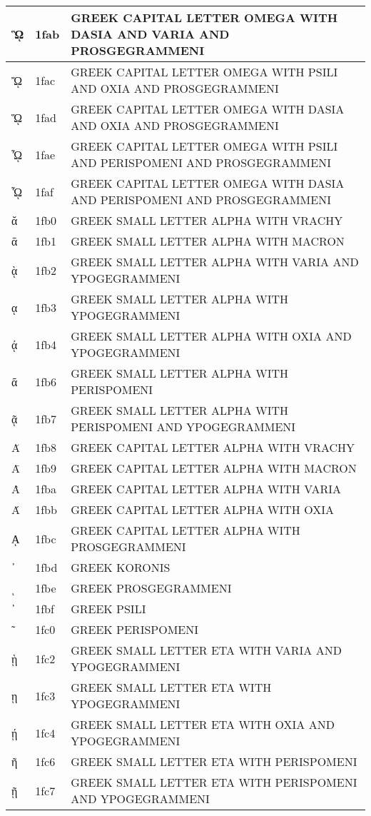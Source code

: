 \documentclass[12pt,letterpaper,openany]{book}
\begin{document}
\begin{center}
\begin{supertabular}{|m{0.25in}|m{0.5in}|m{4in}|}
ᾫ & 1fab & GREEK CAPITAL LETTER OMEGA WITH DASIA AND VARIA AND PROSGEGRAMMENI\\\hline
ᾬ & 1fac & GREEK CAPITAL LETTER OMEGA WITH PSILI AND OXIA AND PROSGEGRAMMENI\\\hline
ᾭ & 1fad & GREEK CAPITAL LETTER OMEGA WITH DASIA AND OXIA AND PROSGEGRAMMENI\\\hline
ᾮ & 1fae & GREEK CAPITAL LETTER OMEGA WITH PSILI AND PERISPOMENI AND PROSGEGRAMMENI\\\hline
ᾯ & 1faf & GREEK CAPITAL LETTER OMEGA WITH DASIA AND PERISPOMENI AND PROSGEGRAMMENI\\\hline
ᾰ & 1fb0 & GREEK SMALL LETTER ALPHA WITH VRACHY\\\hline
ᾱ & 1fb1 & GREEK SMALL LETTER ALPHA WITH MACRON\\\hline
ᾲ & 1fb2 & GREEK SMALL LETTER ALPHA WITH VARIA AND YPOGEGRAMMENI\\\hline
ᾳ & 1fb3 & GREEK SMALL LETTER ALPHA WITH YPOGEGRAMMENI\\\hline
ᾴ & 1fb4 & GREEK SMALL LETTER ALPHA WITH OXIA AND YPOGEGRAMMENI\\\hline
ᾶ & 1fb6 & GREEK SMALL LETTER ALPHA WITH PERISPOMENI\\\hline
ᾷ & 1fb7 & GREEK SMALL LETTER ALPHA WITH PERISPOMENI AND YPOGEGRAMMENI\\\hline
Ᾰ & 1fb8 & GREEK CAPITAL LETTER ALPHA WITH VRACHY\\\hline
Ᾱ & 1fb9 & GREEK CAPITAL LETTER ALPHA WITH MACRON\\\hline
Ὰ & 1fba & GREEK CAPITAL LETTER ALPHA WITH VARIA\\\hline
Ά & 1fbb & GREEK CAPITAL LETTER ALPHA WITH OXIA\\\hline
ᾼ & 1fbc & GREEK CAPITAL LETTER ALPHA WITH PROSGEGRAMMENI\\\hline
᾽ & 1fbd & GREEK KORONIS\\\hline
ι & 1fbe & GREEK PROSGEGRAMMENI\\\hline
᾿ & 1fbf & GREEK PSILI\\\hline
῀ & 1fc0 & GREEK PERISPOMENI\\\hline
ῂ & 1fc2 & GREEK SMALL LETTER ETA WITH VARIA AND YPOGEGRAMMENI\\\hline
ῃ & 1fc3 & GREEK SMALL LETTER ETA WITH YPOGEGRAMMENI\\\hline
ῄ & 1fc4 & GREEK SMALL LETTER ETA WITH OXIA AND YPOGEGRAMMENI\\\hline
ῆ & 1fc6 & GREEK SMALL LETTER ETA WITH PERISPOMENI\\\hline
ῇ & 1fc7 & GREEK SMALL LETTER ETA WITH PERISPOMENI AND YPOGEGRAMMENI\\\hline

\end{supertabular}
\end{center}
\end{document}
